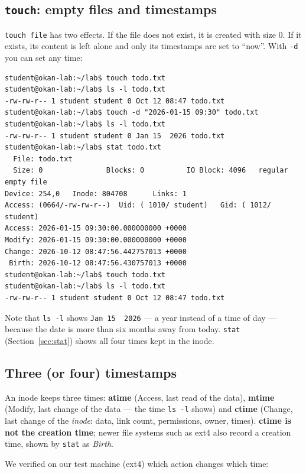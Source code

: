 \documentclass[11pt,a4paper]{article}
\newcommand{\term}[1]{\textbf{\color{mintdeep}#1}}
\newcommand{\cmd}[1]{\texttt{#1}}
\begin{document}
\subsection{\texttt{touch}: empty files and timestamps}

\cmd{touch file} has two effects. If the file does not exist, it is created with size $0$. If it exists, its content is left alone and only its timestamps are set to ``now''. With \cmd{-d} you can set any time:

\begin{lstlisting}[style=term]
student@okan-lab:~/lab$ touch todo.txt
student@okan-lab:~/lab$ ls -l todo.txt
-rw-rw-r-- 1 student student 0 Oct 12 08:47 todo.txt
student@okan-lab:~/lab$ touch -d "2026-01-15 09:30" todo.txt
student@okan-lab:~/lab$ ls -l todo.txt
-rw-rw-r-- 1 student student 0 Jan 15  2026 todo.txt
student@okan-lab:~/lab$ stat todo.txt
  File: todo.txt
  Size: 0               Blocks: 0          IO Block: 4096   regular empty file
Device: 254,0   Inode: 804708      Links: 1
Access: (0664/-rw-rw-r--)  Uid: ( 1010/ student)   Gid: ( 1012/ student)
Access: 2026-01-15 09:30:00.000000000 +0000
Modify: 2026-01-15 09:30:00.000000000 +0000
Change: 2026-10-12 08:47:56.442757013 +0000
 Birth: 2026-10-12 08:47:56.430757013 +0000
student@okan-lab:~/lab$ touch todo.txt
student@okan-lab:~/lab$ ls -l todo.txt
-rw-rw-r-- 1 student student 0 Oct 12 08:47 todo.txt
\end{lstlisting}

Note that \cmd{ls -l} shows \texttt{Jan 15\ \ 2026} --- a year instead of a time of day --- because the date is more than six months away from today. \cmd{stat} (Section~\ref{sec:stat}) shows all four times kept in the inode.

\subsection{Three (or four) timestamps}

An inode keeps three times: \term{atime} (Access, last read of the data), \term{mtime} (Modify, last change of the data --- the time \cmd{ls -l} shows) and \term{ctime} (Change, last change of the \emph{inode}: data, link count, permissions, owner, times). \textbf{ctime is not the creation time}; newer file systems such as ext4 also record a creation time, shown by \cmd{stat} as \emph{Birth}.

We verified on our test machine (ext4) which action changes which time:
\end{document}
